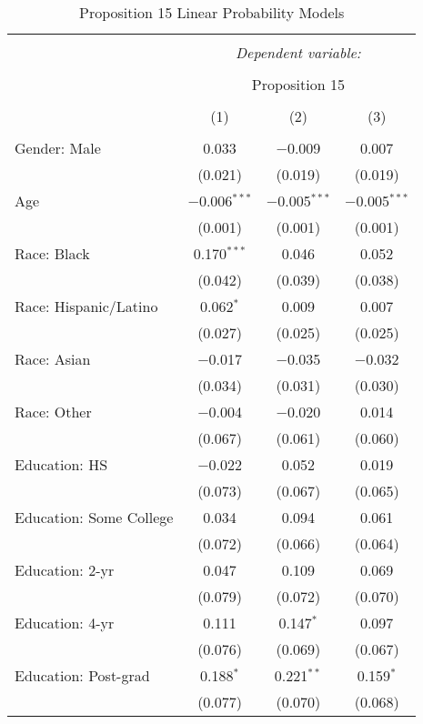 
\begin{table}[!htbp] \centering 
  \caption{Proposition 15 Linear Probability Models} 
  \label{} 
\footnotesize 
\begin{tabular}{@{\extracolsep{5pt}}lccc} 
\\[-1.8ex]\hline 
\hline \\[-1.8ex] 
 & \multicolumn{3}{c}{\textit{Dependent variable:}} \\ 
\cline{2-4} 
\\[-1.8ex] & \multicolumn{3}{c}{Proposition 15} \\ 
\\[-1.8ex] & (1) & (2) & (3)\\ 
\hline \\[-1.8ex] 
 Gender: Male & 0.033 & $-$0.009 & 0.007 \\ 
  & (0.021) & (0.019) & (0.019) \\ 
  Age & $-$0.006$^{***}$ & $-$0.005$^{***}$ & $-$0.005$^{***}$ \\ 
  & (0.001) & (0.001) & (0.001) \\ 
  Race: Black & 0.170$^{***}$ & 0.046 & 0.052 \\ 
  & (0.042) & (0.039) & (0.038) \\ 
  Race: Hispanic/Latino & 0.062$^{*}$ & 0.009 & 0.007 \\ 
  & (0.027) & (0.025) & (0.025) \\ 
  Race: Asian & $-$0.017 & $-$0.035 & $-$0.032 \\ 
  & (0.034) & (0.031) & (0.030) \\ 
  Race: Other & $-$0.004 & $-$0.020 & 0.014 \\ 
  & (0.067) & (0.061) & (0.060) \\ 
  Education: HS & $-$0.022 & 0.052 & 0.019 \\ 
  & (0.073) & (0.067) & (0.065) \\ 
  Education: Some College & 0.034 & 0.094 & 0.061 \\ 
  & (0.072) & (0.066) & (0.064) \\ 
  Education: 2-yr & 0.047 & 0.109 & 0.069 \\ 
  & (0.079) & (0.072) & (0.070) \\ 
  Education: 4-yr & 0.111 & 0.147$^{*}$ & 0.097 \\ 
  & (0.076) & (0.069) & (0.067) \\ 
  Education: Post-grad & 0.188$^{*}$ & 0.221$^{**}$ & 0.159$^{*}$ \\ 
  & (0.077) & (0.070) & (0.068) \\ 

\end{tabular}
\end{table}
